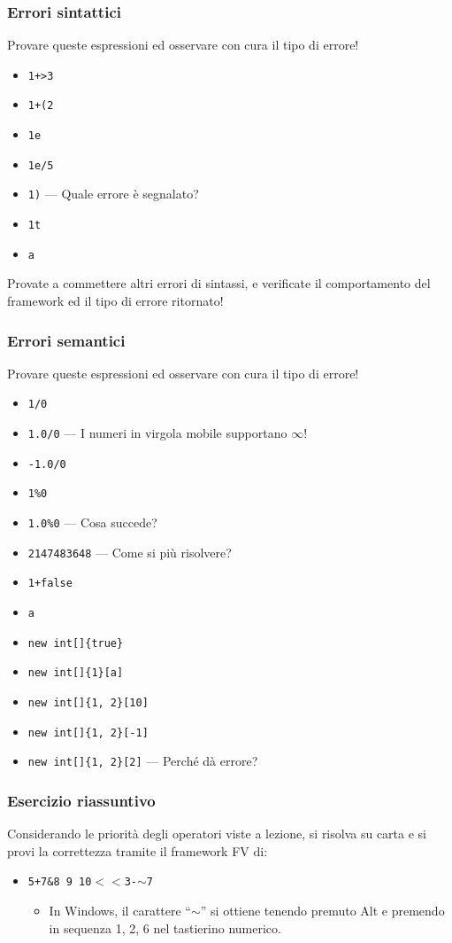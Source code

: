 \documentclass{beamer}
\begin{document}
\begin{frame}
\frametitle{Errori sintattici}
Provare queste espressioni ed osservare con cura il tipo di errore!
\begin{itemize}
 \item \texttt{1+>3} 
 \item \texttt{1+(2} 
 \item \texttt{1e} 
 \item \texttt{1e/5} 
 \item \texttt{1)} --- Quale errore è segnalato?
 \item \texttt{1^^4} 
 \item \texttt{\textquotedbl{}a}
\end{itemize}
Provate a commettere altri errori di sintassi, e verificate il comportamento del framework ed il tipo di errore ritornato!
\end{frame}

\begin{frame}
\frametitle{Errori semantici}
Provare queste espressioni ed osservare con cura il tipo di errore!
\begin{itemize}
 \item \texttt{1/0} 
 \item \texttt{1.0/0} --- I numeri in virgola mobile supportano $\infty$!
 \item \texttt{-1.0/0} 
 \item \texttt{1\%0}
 \item \texttt{1.0\%0} --- Cosa succede?
 \item \texttt{2147483648} --- Come si più risolvere?
 \item \texttt{1+false} 
 \item \texttt{a} 
 \item \texttt{new int[]\{true\}} 
 \item \texttt{new int[]\{1\}[a]}
 \item \texttt{new int[]\{1, 2\}[10]}
 \item \texttt{new int[]\{1, 2\}[-1]}
 \item \texttt{new int[]\{1, 2\}[2]} --- Perché dà errore?
\end{itemize}
\end{frame}

\begin{frame}
\frametitle{Esercizio riassuntivo}
Considerando le priorità degli operatori viste a lezione, si risolva su carta e si provi la correttezza tramite il framework FV di:
\begin{itemize}
 \item \texttt{5+7\&8 \textbar{} 9 \textbar{} 10$<<$3-$\sim$7} 
  \begin{itemize}
  \item In Windows, il carattere ``$\sim$'' si ottiene tenendo premuto Alt e premendo in sequenza 1, 2, 6 nel tastierino numerico.
  \end{itemize}
\end{itemize}
\end{frame}
\end{document}
